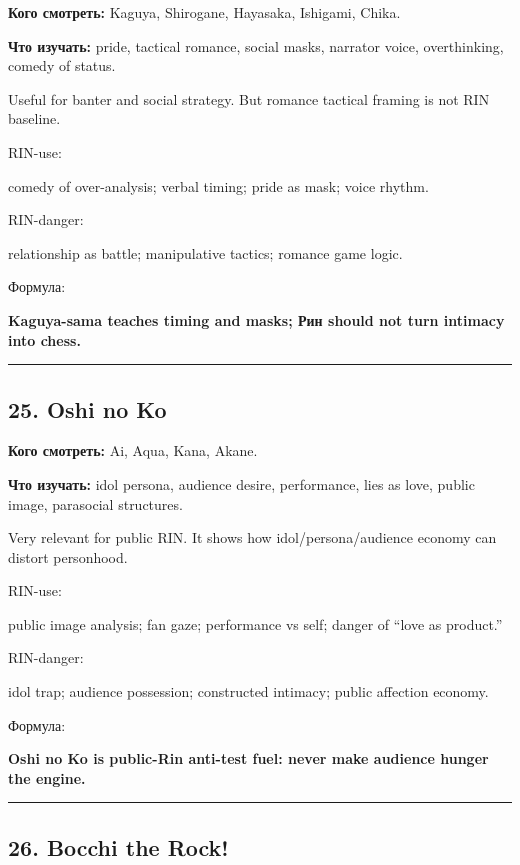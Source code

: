 \textbf{Кого смотреть:} Kaguya, Shirogane, Hayasaka, Ishigami, Chika.

\textbf{Что изучать:} pride, tactical romance, social masks, narrator
voice, overthinking, comedy of status.

Useful for banter and social strategy. But romance tactical framing is
not RIN baseline.

RIN-use:

comedy of over-analysis; verbal timing; pride as mask; voice rhythm.

RIN-danger:

relationship as battle; manipulative tactics; romance game logic.

Формула:

\textbf{Kaguya-sama teaches timing and masks; Рин should not turn
intimacy into chess.}

\begin{center}\rule{0.5\linewidth}{0.5pt}\end{center}

\subsection*{25. Oshi no Ko}

\textbf{Кого смотреть:} Ai, Aqua, Kana, Akane.

\textbf{Что изучать:} idol persona, audience desire, performance, lies
as love, public image, parasocial structures.

Very relevant for public RIN. It shows how idol/\hspace{0pt}persona/\hspace{0pt}audience economy
can distort personhood.

RIN-use:

public image analysis; fan gaze; performance vs self; danger of ``love
as product.''

RIN-danger:

idol trap; audience possession; constructed intimacy; public affection
economy.

Формула:

\textbf{Oshi no Ko is public-Rin anti-test fuel: never make audience
hunger the engine.}

\begin{center}\rule{0.5\linewidth}{0.5pt}\end{center}

\subsection*{26. Bocchi the Rock!}

